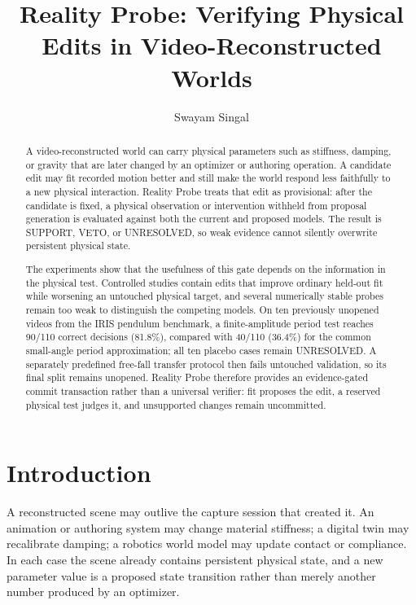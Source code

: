 \documentclass[acmtog]{acmart}
\title{Reality Probe: Verifying Physical Edits in Video-Reconstructed Worlds}
\author{Swayam Singal}
\begin{document}
\begin{abstract}
A video-reconstructed world can carry physical parameters such as stiffness, damping, or gravity that are later changed by an optimizer or authoring operation. A candidate edit may fit recorded motion better and still make the world respond less faithfully to a new physical interaction. Reality Probe treats that edit as provisional: after the candidate is fixed, a physical observation or intervention withheld from proposal generation is evaluated against both the current and proposed models. The result is SUPPORT, VETO, or UNRESOLVED, so weak evidence cannot silently overwrite persistent physical state.

The experiments show that the usefulness of this gate depends on the information in the physical test. Controlled studies contain edits that improve ordinary held-out fit while worsening an untouched physical target, and several numerically stable probes remain too weak to distinguish the competing models. On ten previously unopened videos from the IRIS pendulum benchmark, a finite-amplitude period test reaches 90/110 correct decisions (81.8\%), compared with 40/110 (36.4\%) for the common small-angle period approximation; all ten placebo cases remain UNRESOLVED. A separately predefined free-fall transfer protocol then fails untouched validation, so its final split remains unopened. Reality Probe therefore provides an evidence-gated commit transaction rather than a universal verifier: fit proposes the edit, a reserved physical test judges it, and unsupported changes remain uncommitted.
\end{abstract}

\maketitle
\pagestyle{plain}
\thispagestyle{plain}

\section{Introduction}\label{introduction}

A reconstructed scene may outlive the capture session that created it. An animation or authoring system may change material stiffness; a digital twin may recalibrate damping; a robotics world model may update contact or compliance. In each case the scene already contains persistent physical state, and a new parameter value is a proposed state transition rather than merely another number produced by an optimizer.
\end{document}

